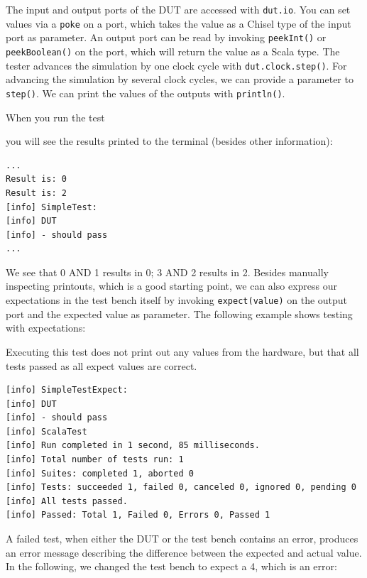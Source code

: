 \documentclass[%
    10pt,
    headinclude, footexclude,
    openright, %
    notitlepage,
    cleardoubleempty,
    headsepline,
    pointlessnumbers,
    bibtotoc, idxtotoc,
    ]{scrbook}
\newcommand{\code}[1]{{\small{\texttt{#1}}}}
\begin{document}


The input and output ports of the DUT are accessed with \code{dut.io}.
You can set values via a \code{poke} on a port, which takes the value as a Chisel type of the
input port as parameter.
An output port can be read by invoking \code{peekInt()} or \code{peekBoolean()} on the port,
which will return the value as a Scala type.
The tester advances the simulation by one clock cycle with \code{dut.clock.step()}.
For advancing the simulation by several clock cycles, we can provide a parameter to
\code{step()}.
We can print the values of the outputs with \code{println()}.



When you run the test


\noindent you will see the results printed to the terminal
(besides other information):

\begin{verbatim}
...
Result is: 0
Result is: 2
[info] SimpleTest:
[info] DUT
[info] - should pass
...
\end{verbatim}

We see that 0 AND 1 results in 0; 3 AND 2 results in 2.
Besides manually inspecting printouts, which is a good starting point, we can also
express our expectations in the test bench itself by invoking
\code{expect(value)} on the output port and the expected value as parameter.
The following example shows testing with expectations:


Executing this test does not print out any values from the hardware,
but that all tests passed as all expect values are correct.

\begin{verbatim}
[info] SimpleTestExpect:
[info] DUT
[info] - should pass
[info] ScalaTest
[info] Run completed in 1 second, 85 milliseconds.
[info] Total number of tests run: 1
[info] Suites: completed 1, aborted 0
[info] Tests: succeeded 1, failed 0, canceled 0, ignored 0, pending 0
[info] All tests passed.
[info] Passed: Total 1, Failed 0, Errors 0, Passed 1
\end{verbatim}

A failed test, when either the DUT or the test bench contains an error,
produces an error message describing the difference between the expected and actual
value. In the following, we changed the test bench to expect a 4, which is an error:
\end{document}
